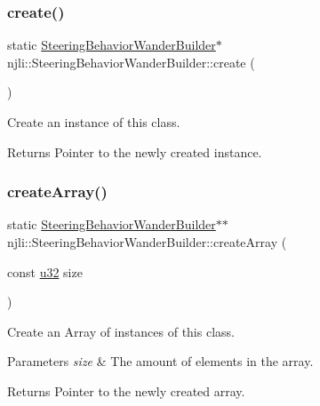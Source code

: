 \subsubsection{\texorpdfstring{create()}{create()}}
{\footnotesize\ttfamily static \mbox{\hyperlink{classnjli_1_1_steering_behavior_wander_builder}{Steering\+Behavior\+Wander\+Builder}}$\ast$ njli\+::\+Steering\+Behavior\+Wander\+Builder\+::create (\begin{DoxyParamCaption}{ }\end{DoxyParamCaption})\hspace{0.3cm}{\ttfamily [static]}}

Create an instance of this class.

\begin{DoxyReturn}{Returns}
Pointer to the newly created instance. 
\end{DoxyReturn}
\mbox{\label{classnjli_1_1_steering_behavior_wander_builder_ab1bed63bdaff471963e8a73365ff031b}} 
\subsubsection{\texorpdfstring{create\+Array()}{createArray()}}
{\footnotesize\ttfamily static \mbox{\hyperlink{classnjli_1_1_steering_behavior_wander_builder}{Steering\+Behavior\+Wander\+Builder}}$\ast$$\ast$ njli\+::\+Steering\+Behavior\+Wander\+Builder\+::create\+Array (\begin{DoxyParamCaption}\item[{const \mbox{\hyperlink{_util_8h_a10e94b422ef0c20dcdec20d31a1f5049}{u32}}}]{size }\end{DoxyParamCaption})\hspace{0.3cm}{\ttfamily [static]}}

Create an Array of instances of this class.


\begin{DoxyParams}{Parameters}
{\em size} & The amount of elements in the array.\\
\hline
\end{DoxyParams}
\begin{DoxyReturn}{Returns}
Pointer to the newly created array. 
\end{DoxyReturn}
\mbox{\label{classnjli_1_1_steering_behavior_wander_builder_a0392fb6f7aa53083408c6ece75b00c60}} 
